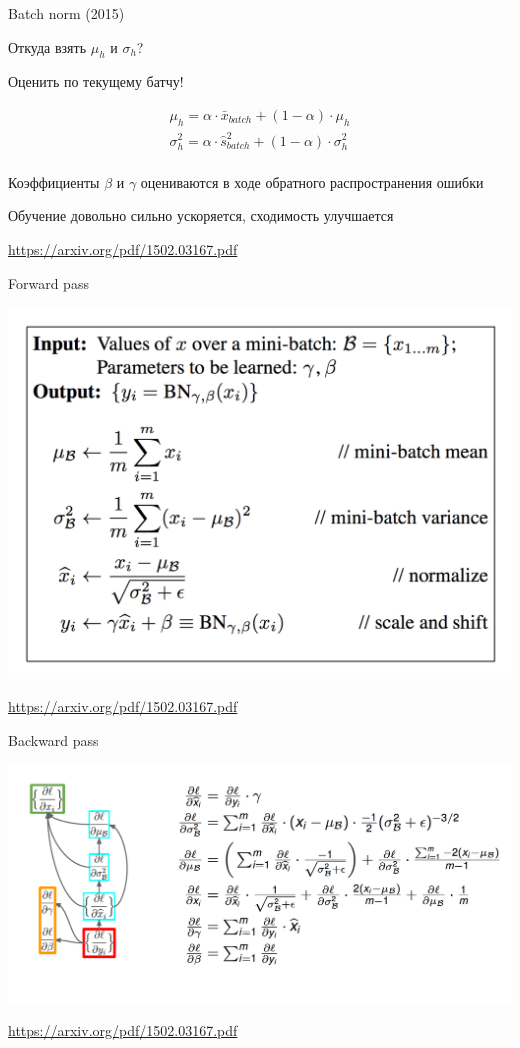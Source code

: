 \documentclass[notes,12pt, aspectratio=169]{beamer}
\newenvironment{wideitemize}{\itemize\addtolength{\itemsep}{10pt}}{\enditemize}
\begin{document}
\begin{frame}{Batch norm (2015)}
\begin{wideitemize}
\item  Откуда взять $\mu_h$ и $\sigma_h$? 

\item Оценить по текущему батчу! 

\begin{align*} 
\mu_h =  \alpha \cdot \bar x_{batch}  + (1 - \alpha) \cdot \mu_h \\ 
\sigma_h^2 =  \alpha \cdot \hat s^2_{batch}  + (1 - \alpha) \cdot \sigma^2_h \\ 
\end{align*}

\item Коэффициенты $\beta$ и $\gamma$ оцениваются в ходе обратного распространения ошибки

\item Обучение довольно сильно ускоряется, сходимость улучшается 
\end{wideitemize}

\vfill %
\footnotesize
{\color{blue} \url{https://arxiv.org/pdf/1502.03167.pdf}}
\end{frame}


\begin{frame}{Forward pass}
\begin{center}
	\includegraphics[width=.6\linewidth]{batch_formulas.png}
\end{center}
\vfill %
\footnotesize
{\color{blue} \url{https://arxiv.org/pdf/1502.03167.pdf}}
\end{frame}


\begin{frame}{Backward pass}
\begin{center}
	\includegraphics[width=.9\linewidth]{batch_grad.png}
\end{center}
\vfill %
\footnotesize
{\color{blue} \url{https://arxiv.org/pdf/1502.03167.pdf}}
\end{frame}
\end{document}
